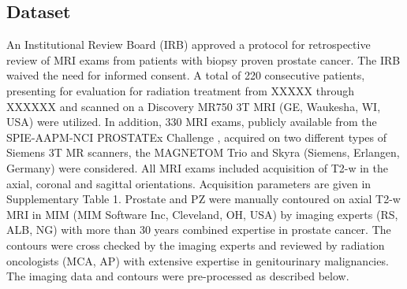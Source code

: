 \subsection{Dataset}
\label{subsec:dataset}
 An Institutional Review Board (IRB) approved a protocol for retrospective review of MRI exams from patients with biopsy proven prostate cancer. The IRB waived the need for informed consent. A total of 220 consecutive patients, presenting for evaluation for radiation treatment from XXXXX through XXXXXX and scanned on a Discovery MR750 3T MRI (GE, Waukesha, WI, USA) were utilized. In addition, 330 MRI exams, publicly available from the SPIE-AAPM-NCI PROSTATEx Challenge \cite{deukwoo_classification_2018}, acquired on two different types of Siemens 3T MR scanners, the MAGNETOM Trio and Skyra (Siemens, Erlangen, Germany) were considered. All MRI exams included acquisition of T2-w in the axial, coronal and sagittal orientations. Acquisition parameters are given in Supplementary Table 1.
Prostate and PZ were manually contoured on axial T2-w MRI in MIM (MIM Software Inc, Cleveland, OH, USA) by imaging experts (RS, ALB, NG) with more than 30 years combined expertise in prostate cancer. The contours were cross checked by the imaging experts and reviewed by radiation oncologists (MCA, AP) with extensive expertise in genitourinary malignancies.
The imaging data and contours were pre-processed as described below.


